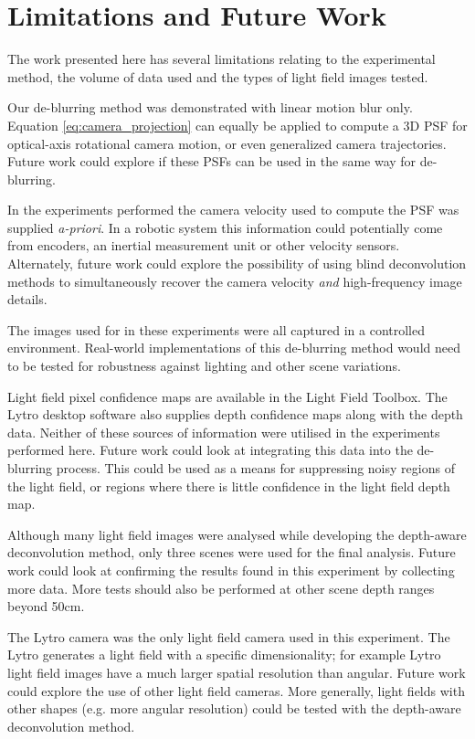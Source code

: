 \section{Limitations and Future Work}
\label{sec:limitations_and_future_work}

The work presented here has several limitations relating to the experimental method, the volume of data used and the types of light field images tested.

Our de-blurring method was demonstrated with linear motion blur only.
Equation \ref{eq:camera_projection} can equally be applied to compute a 3D PSF for optical-axis rotational camera motion, or even generalized camera trajectories.
Future work could explore if these PSFs can be used in the same way for de-blurring.

In the experiments performed the camera velocity used to compute the PSF was supplied \emph{a-priori}.
In a robotic system this information could potentially come from encoders, an inertial measurement unit or other velocity sensors.
Alternately, future work could explore the possibility of using blind deconvolution methods to simultaneously recover the camera velocity \emph{and} high-frequency image details.

The images used for in these experiments were all captured in a controlled environment.
Real-world implementations of this de-blurring method would need to be tested for robustness against lighting and other scene variations.

Light field pixel confidence maps are available in the Light Field Toolbox.
The Lytro desktop software also supplies depth confidence maps along with the depth data.
Neither of these sources of information were utilised in the experiments performed here.
Future work could look at integrating this data into the de-blurring process.
This could be used as a means for suppressing noisy regions of the light field, or regions where there is little confidence in the light field depth map.

Although many light field images were analysed while developing the depth-aware deconvolution method, only three scenes were used for the final analysis.
Future work could look at confirming the results found in this experiment by collecting more data.
More tests should also be performed at other scene depth ranges beyond 50cm.

The Lytro camera was the only light field camera used in this experiment.
The Lytro generates a light field with a specific dimensionality; for example Lytro light field images have a much larger spatial resolution than angular.
Future work could explore the use of other light field cameras.
More generally, light fields with other shapes (e.g. more angular resolution) could be tested with the depth-aware deconvolution method.

